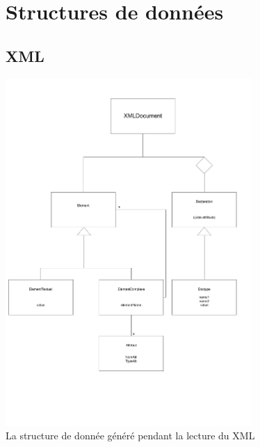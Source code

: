 \section{Structures de données}

    \subsection{XML}
        \includegraphics[width=0.7\textwidth]{img/ClassesXML.pdf}\\
        La structure de donnée généré pendant la lecture du XML
        
